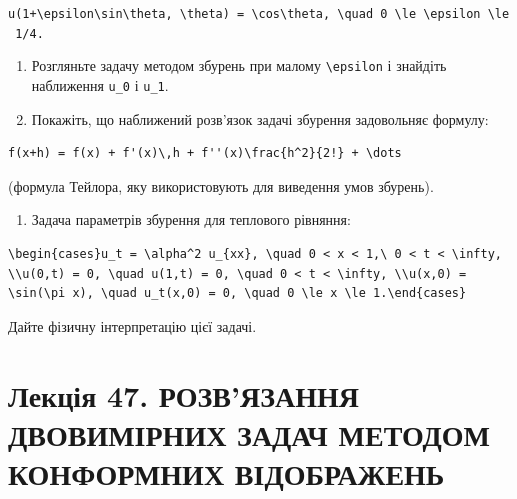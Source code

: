 \documentclass[
  ukrainian,
]{article}
\providecommand{\tightlist}{%
  \setlength{\itemsep}{0pt}\setlength{\parskip}{0pt}}
\begin{document}
\texttt{u(1+\textbackslash{}epsilon\textbackslash{}sin\textbackslash{}theta,\ \textbackslash{}theta)\ =\ \textbackslash{}cos\textbackslash{}theta,\ \textbackslash{}quad\ 0\ \textbackslash{}le\ \textbackslash{}epsilon\ \textbackslash{}le\ 1/4.}

\begin{enumerate}
\def\labelenumi{\arabic{enumi}.}
\setcounter{enumi}{1}
\item
  Розгляньте задачу методом збурень при малому
  \texttt{\textbackslash{}epsilon} і знайдіть наближення \texttt{u\_0} і
  \texttt{u\_1}.
\item
  Покажіть, що наближений розв'язок задачі збурення задовольняє формулу:
\end{enumerate}

\begin{verbatim}
f(x+h) = f(x) + f'(x)\,h + f''(x)\frac{h^2}{2!} + \dots
\end{verbatim}

(формула Тейлора, яку використовують для виведення умов збурень).

\begin{enumerate}
\def\labelenumi{\arabic{enumi}.}
\setcounter{enumi}{3}
\tightlist
\item
  Задача параметрів збурення для теплового рівняння:
\end{enumerate}

\begin{verbatim}
\begin{cases}u_t = \alpha^2 u_{xx}, \quad 0 < x < 1,\ 0 < t < \infty, \\u(0,t) = 0, \quad u(1,t) = 0, \quad 0 < t < \infty, \\u(x,0) = \sin(\pi x), \quad u_t(x,0) = 0, \quad 0 \le x \le 1.\end{cases}
\end{verbatim}

Дайте фізичну інтерпретацію цієї задачі.

\section{Лекція 47. РОЗВ'ЯЗАННЯ ДВОВИМІРНИХ ЗАДАЧ МЕТОДОМ КОНФОРМНИХ
ВІДОБРАЖЕНЬ}\label{ux43bux435ux43aux446ux456ux44f-47.-ux440ux43eux437ux432ux44fux437ux430ux43dux43dux44f-ux434ux432ux43eux432ux438ux43cux456ux440ux43dux438ux445-ux437ux430ux434ux430ux447-ux43cux435ux442ux43eux434ux43eux43c-ux43aux43eux43dux444ux43eux440ux43cux43dux438ux445-ux432ux456ux434ux43eux431ux440ux430ux436ux435ux43dux44c}
\end{document}
